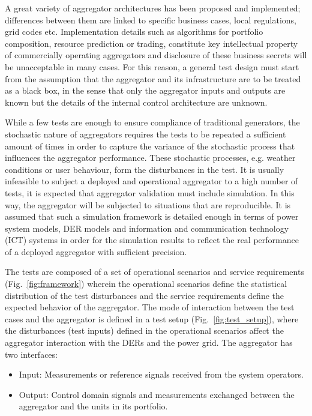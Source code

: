 A great variety of aggregator architectures has been proposed and implemented; differences between them are linked to specific business cases, local regulations, grid codes etc. Implementation details such as algorithms for portfolio composition, resource prediction or trading, constitute key intellectual property of commercially operating aggregators and disclosure of these business secrets will be unacceptable in many cases. For this reason, a general test design must start from the assumption that the aggregator and its infrastructure are to be treated as a black box, in the sense that only the aggregator inputs and outputs are known but the details of the internal control architecture are unknown. 

While a few tests are enough to ensure compliance of traditional generators, the stochastic nature of aggregators requires the tests to be repeated a sufficient amount of times in order to capture the variance of the stochastic process that influences the aggregator performance. These stochastic processes, e.g. weather conditions or user behaviour, form the disturbances in the test. It is usually infeasible to subject a deployed and operational aggregator to a high number of tests, it is expected that aggregator validation must include simulation. In this way, the aggregator will be subjected to situations that are reproducible. It is assumed that such a simulation framework is detailed enough in terms of power system models, DER models and information and communication technology (ICT) systems in order for the simulation results to reflect the real performance of a deployed aggregator with sufficient precision.

The tests are composed of a set of operational scenarios and service requirements (Fig.~\ref{fig:framework}) wherein the operational scenarios define the statistical distribution of the test disturbances and the service requirements define the expected behavior of the aggregator. The mode of interaction between the test cases and the aggregator is defined in a test setup (Fig.~\ref{fig:test_setup}), where the disturbances (test inputs) defined in the operational scenarios affect the aggregator interaction with the DERs and the power grid. The aggregator has two interfaces:
\begin{itemize}
\item Input: Measurements or reference signals received from the system operators.
\item Output: Control domain signals and measurements exchanged between the aggregator and the units in its portfolio.
\end{itemize}

